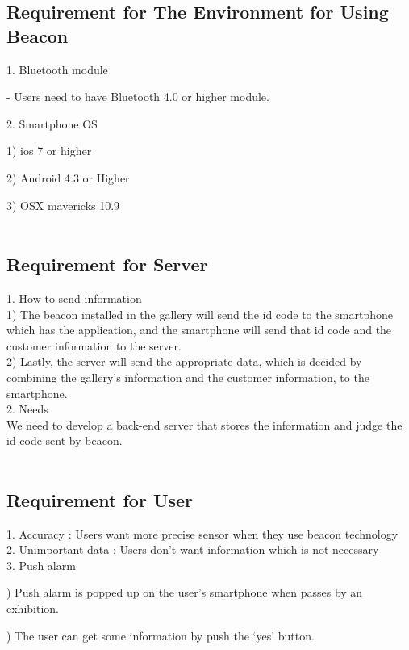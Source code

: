 \documentclass[conference]{IEEEtran}
\begin{document}
\subsection{Requirement for The Environment for Using Beacon}

1. Bluetooth module

- Users need to have Bluetooth 4.0 or higher module.

2. Smartphone OS

1) ios 7 or higher

2) Android 4.3 or Higher

3) OSX mavericks 10.9\\\\

\subsection{Requirement for Server}
1. How to send information\\

1) The beacon installed in the gallery will send the id code to the smartphone which has the application, and the smartphone will send that id code and the customer information to the server. \\

2) Lastly, the server will send the appropriate data, which is decided by combining the gallery’s information and the customer information, to the smartphone.\\

2.  Needs\\
 We need to develop a back-end server that stores the information and judge the id code sent by beacon.\\\\

\subsection{Requirement for User}
1. Accuracy : Users want more precise sensor when they use beacon technology\\

2. Unimportant data : Users don’t want information which is not necessary\\

3. Push alarm

) Push alarm is popped up on the user’s smartphone when passes by an exhibition.

) The user can get some information by push the ‘yes’ button.\\
\end{document}
